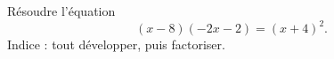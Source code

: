 
\begin{exercice}\label{exoPremiere-0042}

    Résoudre l'équation 
    \begin{equation}
        (x-8)(-2x-2)=(x+4)^2.
    \end{equation}
    Indice : tout développer, puis factoriser. 

\end{exercice}
